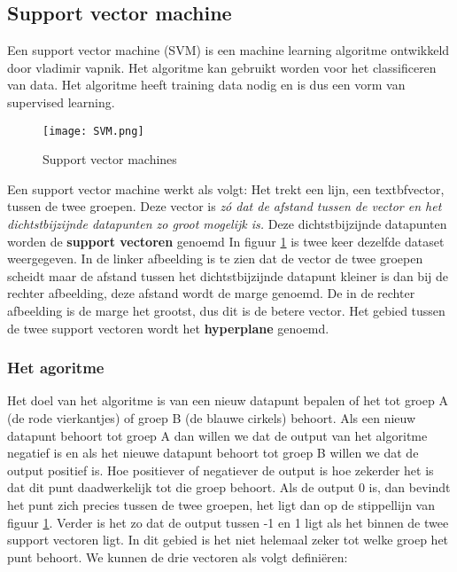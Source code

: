 \subsection{Support vector machine}
Een support vector machine (SVM) is een machine learning algoritme ontwikkeld door vladimir vapnik. Het algoritme kan gebruikt worden voor het classificeren van data. Het algoritme heeft training data nodig en is dus een vorm van supervised learning. \cite{SVM}

\begin{figure}[h]
  \centering
    \texttt{[image: SVM.png]}
  \caption{Support vector machines}
  \label{fig:SupVectorMachine1}
\end{figure}

Een support vector machine werkt als volgt: Het trekt een lijn, een textbf{vector}, tussen de twee groepen. Deze vector is \textit{z\'o dat de afstand tussen de vector en het dichtstbijzijnde datapunten zo groot mogelijk is.} \cite{SVM2} Deze dichtstbijzijnde datapunten worden de \textbf{support vectoren} genoemd In figuur \ref{fig:SupVectorMachine1} is twee keer dezelfde dataset weergegeven. In de linker afbeelding is te zien dat de vector de twee groepen scheidt maar de afstand tussen het dichtstbijzijnde datapunt kleiner is dan bij de rechter afbeelding, deze afstand wordt de marge genoemd. De in de rechter afbeelding is de marge het grootst, dus dit is de betere vector. Het gebied tussen de twee support vectoren wordt het \textbf{hyperplane} genoemd.

\subsubsection{Het agoritme}
Het doel van het algoritme is van een nieuw datapunt bepalen of het tot groep A (de rode vierkantjes) of groep B (de blauwe cirkels) behoort. Als een nieuw datapunt behoort tot groep A dan willen we dat de output van het algoritme negatief is en als het nieuwe datapunt behoort tot groep B willen we dat de output positief is. Hoe positiever of negatiever de output is hoe zekerder het is dat dit punt daadwerkelijk tot die groep behoort. Als de output 0 is, dan bevindt het punt zich precies tussen de twee groepen, het ligt dan op de stippellijn van figuur \ref{fig:SupVectorMachine1}. Verder is het zo dat de output tussen -1 en 1 ligt als het binnen de twee support vectoren ligt. In dit gebied is het niet helemaal zeker tot welke groep het punt behoort. 
We kunnen de drie vectoren als volgt definiëren: 

